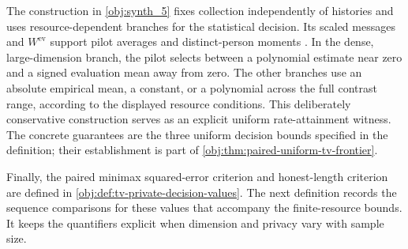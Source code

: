 The construction in \cref{obj:synth_5} fixes collection independently of histories and uses resource-dependent branches for the statistical decision. Its scaled messages  and \(W^{\mathrm{ev}}\) support pilot averages and distinct-person moments . In the dense, large-dimension branch, the pilot selects between a polynomial estimate near zero and a signed evaluation mean away from zero. The other branches use an absolute empirical mean, a constant, or a polynomial across the full contrast range, according to the displayed resource conditions. This deliberately conservative construction serves as an explicit uniform rate-attainment witness. The concrete guarantees are the three uniform decision bounds specified in the definition; their establishment is part of \cref{obj:thm:paired-uniform-tv-frontier}.

Finally, the paired minimax squared-error criterion  and honest-length criterion  are defined in \cref{obj:def:tv-private-decision-values}. The next definition records the sequence comparisons for these values that accompany the finite-resource bounds. It keeps the quantifiers explicit when dimension and privacy vary with sample size.

